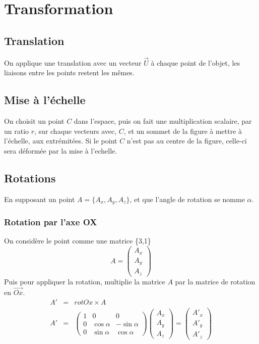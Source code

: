\documentclass{report}
\begin{document}
\chapter{Transformation}
\section{Translation}
On applique une translation avec un vecteur $\vec{U}$ à chaque point de l'objet, les liaisons entre les points restent les mêmes.
\section{Mise à l'échelle}
On choisit un point $C$ dans l'espace, puis on fait une multiplication scalaire, par un ratio $r$, sur chaque vecteurs avec, $C$, et un sommet de la figure à mettre à l'échelle, aux extrémitées.
Si le point $C$ n'est pas au centre de la figure, celle-ci sera déformée par la mise à l'echelle.
\section{Rotations}
En supposant un point $A = \{A_x, A_y, A_z\}$, et que l'angle de rotation se nomme $\alpha$.
\subsection{Rotation par l'axe OX}
On considère le point comme une matrice \{3,1\}
\[
 A = 
 \begin{pmatrix}
  A_x\\
  A_y\\
  A_z
 \end{pmatrix}
\]
Puis pour appliquer la rotation, multiplie la matrice $A$ par la matrice de rotation en $\overrightarrow{Ox}$.
\[
\begin{array}{rcl}
 A' &=& rotOx \times A\\
 A' &=& 
 \begin{pmatrix}%
  1 & 0 & 0\\
  0 & \cos \alpha & - \sin \alpha\\
  0 & \sin \alpha & \cos \alpha
 \end{pmatrix}
 \begin{pmatrix}
  A_x\\
  A_y\\
  A_z
 \end{pmatrix}
  =
  \begin{pmatrix}
   A'_x\\
   A'_y\\
   A'_z
  \end{pmatrix}
 \end{array}
\]
\end{document}
